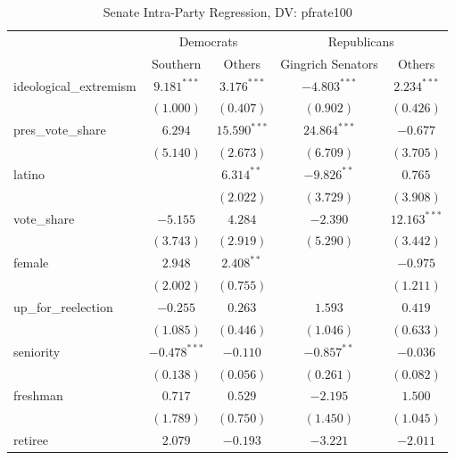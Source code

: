 \documentclass[12pt]{article}
\begin{document}
\begin{table}[H]
	\begin{center}
		\caption{Senate Intra-Party Regression, DV: pfrate100}
		\begin{tabular}{l c c c c }
			\hline
			& \multicolumn{2}{c}{Democrats} & \multicolumn{2}{c}{Republicans} \\
			\cline{2-5}
			& Southern & Others & Gingrich Senators & Others \\
			\hline
			ideological\_extremism & $9.181^{***}$  & $3.176^{***}$  & $-4.803^{***}$ & $2.234^{***}$   \\
			& $(1.000)$      & $(0.407)$      & $(0.902)$      & $(0.426)$       \\
			pres\_vote\_share      & $6.294$        & $15.590^{***}$ & $24.864^{***}$ & $-0.677$        \\
			& $(5.140)$      & $(2.673)$      & $(6.709)$      & $(3.705)$       \\
			latino                 &                & $6.314^{**}$   & $-9.826^{**}$  & $0.765$         \\
			&                & $(2.022)$      & $(3.729)$      & $(3.908)$       \\
			vote\_share            & $-5.155$       & $4.284$        & $-2.390$       & $12.163^{***}$  \\
			& $(3.743)$      & $(2.919)$      & $(5.290)$      & $(3.442)$       \\
			female                 & $2.948$        & $2.408^{**}$   &                & $-0.975$        \\
			& $(2.002)$      & $(0.755)$      &                & $(1.211)$       \\
			up\_for\_reelection    & $-0.255$       & $0.263$        & $1.593$        & $0.419$         \\
			& $(1.085)$      & $(0.446)$      & $(1.046)$      & $(0.633)$       \\
			seniority              & $-0.478^{***}$ & $-0.110$       & $-0.857^{**}$  & $-0.036$        \\
			& $(0.138)$      & $(0.056)$      & $(0.261)$      & $(0.082)$       \\
			freshman               & $0.717$        & $0.529$        & $-2.195$       & $1.500$         \\
			& $(1.789)$      & $(0.750)$      & $(1.450)$      & $(1.045)$       \\
			retiree                & $2.079$        & $-0.193$       & $-3.221$       & $-2.011$        \\

\end{tabular}
\end{center}
\end{table}
\end{document}
